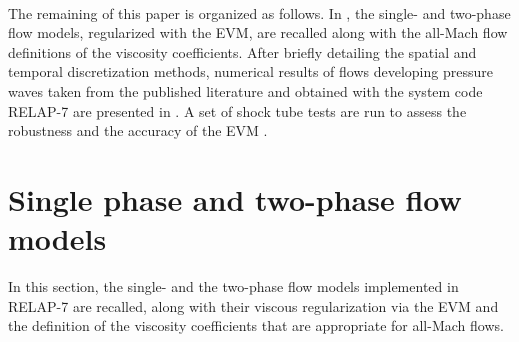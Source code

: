 \documentclass{inputs/mc2015}
\begin{document}
 \\
The remaining of this paper is organized as follows. In , the single- and two-phase flow models, regularized with the EVM, are recalled along with the all-Mach flow definitions of the viscosity coefficients. 
After briefly detailing the spatial and temporal discretization methods, numerical results of flows developing pressure waves taken from the published literature and obtained with the system code RELAP-7 are presented in . A set of shock tube tests \cite{Sokolowski-Koszela} are run to assess the robustness and the accuracy of the EVM .
%

%
\section{Single phase and two-phase flow models}\label{sct:model}
%
In this section, the single- and the two-phase flow models implemented in RELAP-7 are recalled, along with their viscous regularization via the EVM
and the definition of the viscosity coefficients that are appropriate for all-Mach flows. %
%
\end{document}
